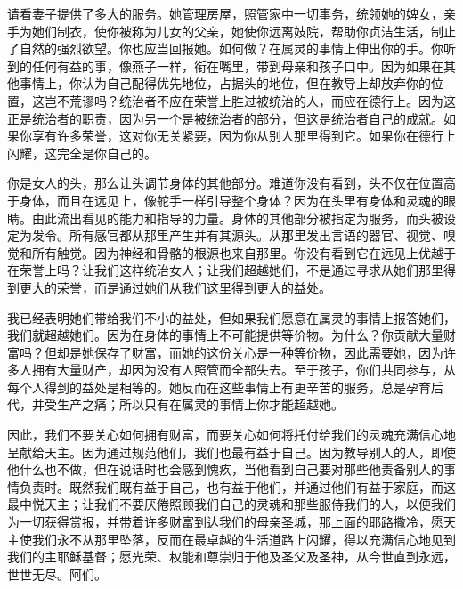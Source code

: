 请看妻子提供了多大的服务。她管理房屋，照管家中一切事务，统领她的婢女，亲手为她们制衣，使你被称为儿女的父亲，她使你远离妓院，帮助你贞洁生活，制止了自然的强烈欲望。你也应当回报她。如何做？在属灵的事情上伸出你的手。你听到的任何有益的事，像燕子一样，衔在嘴里，带到母亲和孩子口中。因为如果在其他事情上，你认为自己配得优先地位，占据头的地位，但在教导上却放弃你的位置，这岂不荒谬吗？统治者不应在荣誉上胜过被统治的人，而应在德行上。因为这正是统治者的职责，因为另一个是被统治者的部分，但这是统治者自己的成就。如果你享有许多荣誉，这对你无关紧要，因为你从别人那里得到它。如果你在德行上闪耀，这完全是你自己的。\par

你是女人的头，那么让头调节身体的其他部分。难道你没有看到，头不仅在位置高于身体，而且在远见上，像舵手一样引导整个身体？因为在头里有身体和灵魂的眼睛。由此流出看见的能力和指导的力量。身体的其他部分被指定为服务，而头被设定为发令。所有感官都从那里产生并有其源头。从那里发出言语的器官、视觉、嗅觉和所有触觉。因为神经和骨骼的根源也来自那里。你没有看到它在远见上优越于在荣誉上吗？让我们这样统治女人；让我们超越她们，不是通过寻求从她们那里得到更大的荣誉，而是通过她们从我们这里得到更大的益处。\par

我已经表明她们带给我们不小的益处，但如果我们愿意在属灵的事情上报答她们，我们就超越她们。因为在身体的事情上不可能提供等价物。为什么？你贡献大量财富吗？但却是她保存了财富，而她的这份关心是一种等价物，因此需要她，因为许多人拥有大量财产，却因为没有人照管而全部失去。至于孩子，你们共同参与，从每个人得到的益处是相等的。她反而在这些事情上有更辛苦的服务，总是孕育后代，并受生产之痛；所以只有在属灵的事情上你才能超越她。\par

因此，我们不要关心如何拥有财富，而要关心如何将托付给我们的灵魂充满信心地呈献给天主。因为通过规范他们，我们也最有益于自己。因为教导别人的人，即使他什么也不做，但在说话时也会感到愧疚，当他看到自己要对那些他责备别人的事情负责时。既然我们既有益于自己，也有益于他们，并通过他们有益于家庭，而这最中悦天主；让我们不要厌倦照顾我们自己的灵魂和那些服侍我们的人，以便我们为一切获得赏报，并带着许多财富到达我们的母亲圣城，那上面的耶路撒冷，愿天主使我们永不从那里坠落，反而在最卓越的生活道路上闪耀，得以充满信心地见到我们的主耶稣基督；愿光荣、权能和尊崇归于他及圣父及圣神，从今世直到永远，世世无尽。阿们。\par


